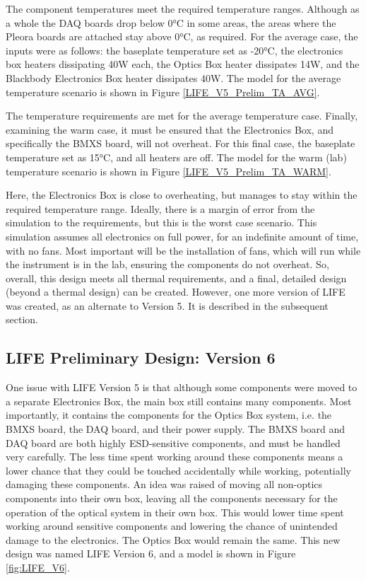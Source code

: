 The component temperatures meet the required temperature ranges. Although as a whole the DAQ boards drop below 0°C in some areas, the areas where the Pleora boards are attached stay above 0°C, as required. For the average case, the inputs were as follows: the baseplate temperature set as -20°C, the electronics box heaters dissipating 40W each, the Optics Box heater dissipates 14W, and the Blackbody Electronics Box heater dissipates 40W. The model for the average temperature scenario is shown in Figure \ref{LIFE_V5_Prelim_TA_AVG}.

The temperature requirements are met for the average temperature case. Finally, examining the warm case, it must be ensured that the Electronics Box, and specifically the BMXS board, will not overheat. For this final case, the baseplate temperature set as 15°C, and all heaters are off. The model for the warm (lab) temperature scenario is shown in Figure \ref{LIFE_V5_Prelim_TA_WARM}.

Here, the Electronics Box is close to overheating, but manages to stay within the required temperature range. Ideally, there is a margin of error from the simulation to the requirements, but this is the worst case scenario. This simulation assumes all electronics on full power, for an indefinite amount of time, with no fans. Most important will be the installation of fans, which will run while the instrument is in the lab, ensuring the components do not overheat. So, overall, this design meets all thermal requirements, and a final, detailed design (beyond a thermal design) can be created. However, one more version of LIFE was created, as an alternate to Version 5. It is described in the subsequent section.

\subsection{LIFE Preliminary Design: Version 6}
One issue with LIFE Version 5 is that although some components were moved to a separate Electronics Box, the main box still contains many components. Most importantly, it contains the components for the Optics Box system, i.e. the BMXS board, the DAQ board, and their power supply. The BMXS board and DAQ board are both highly ESD-sensitive components, and must be handled very carefully. The less time spent working around these components means a lower chance that they could be touched accidentally while working, potentially damaging these components. An idea was raised of moving all non-optics components into their own box, leaving all the components necessary for the operation of the optical system in their own box. This would lower time spent working around sensitive components and lowering the chance of unintended damage to the electronics. The Optics Box would remain the same. This new design was named LIFE Version 6, and a model is shown in Figure \ref{fig:LIFE_V6}.

